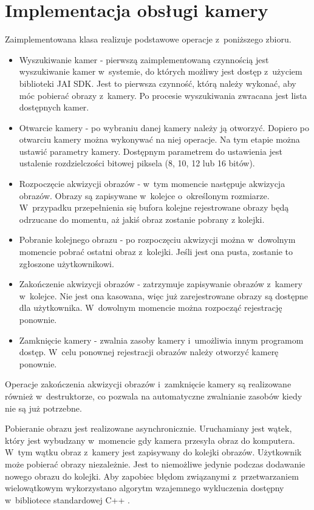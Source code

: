 \section{Implementacja obsługi kamery}
\label{sec:implementacjaKamery}

Zaimplementowana klasa realizuje podstawowe operacje z~poniższego zbioru. 
\begin{itemize}
\item Wyszukiwanie kamer - pierwszą zaimplementowaną czynnością jest wyszukiwanie kamer w~systemie, do których możliwy jest dostęp z~użyciem biblioteki JAI SDK. Jest to pierwsza czynność, którą należy wykonać, aby móc pobierać obrazy z~kamery. Po procesie wyszukiwania zwracana jest lista dostępnych kamer.
\item Otwarcie kamery - po wybraniu danej kamery należy ją otworzyć. Dopiero po otwarciu kamery można wykonywać na niej operacje. Na tym etapie można ustawić parametry kamery. Dostępnym parametrem do ustawienia jest ustalenie rozdzielczości bitowej piksela (8, 10, 12 lub 16 bitów).
\item Rozpoczęcie akwizycji obrazów - w~tym momencie następuje akwizycja obrazów. Obrazy są zapisywane w~kolejce o~określonym rozmiarze. W~przypadku przepełnienia się bufora kolejne rejestrowane obrazy będą odrzucane do momentu, aż jakiś obraz zostanie pobrany z kolejki.
\item Pobranie kolejnego obrazu - po rozpoczęciu akwizycji można w~dowolnym momencie pobrać ostatni obraz z~kolejki. Jeśli jest ona pusta, zostanie to zgłoszone użytkownikowi.
\item Zakończenie akwizycji obrazów - zatrzymuje zapisywanie obrazów z~kamery w~kolejce. Nie jest ona kasowana, więc już zarejestrowane obrazy są dostępne dla użytkownika. W~dowolnym momencie można rozpocząć rejestrację ponownie.
\item Zamknięcie kamery - zwalnia zasoby kamery i~umożliwia innym programom dostęp. W~celu ponownej rejestracji obrazów należy otworzyć kamerę ponownie.
\end{itemize}
Operacje zakończenia akwizycji obrazów i~zamknięcie kamery są realizowane również w~destruktorze, co pozwala na automatyczne zwalnianie zasobów kiedy nie są już potrzebne.

Pobieranie obrazu jest realizowane asynchronicznie. Uruchamiany jest wątek, który jest wybudzany w~momencie gdy kamera przesyła obraz do komputera. W~tym wątku obraz z~kamery jest zapisywany do kolejki obrazów. Użytkownik może pobierać obrazy niezależnie. Jest to niemożliwe jedynie podczas dodawanie nowego obrazu do kolejki. Aby zapobiec błędom związanymi z~przetwarzaniem wielowątkowym wykorzystano algorytm wzajemnego wykluczenia dostępny w~bibliotece standardowej C++ \cite{mutexCpp}.